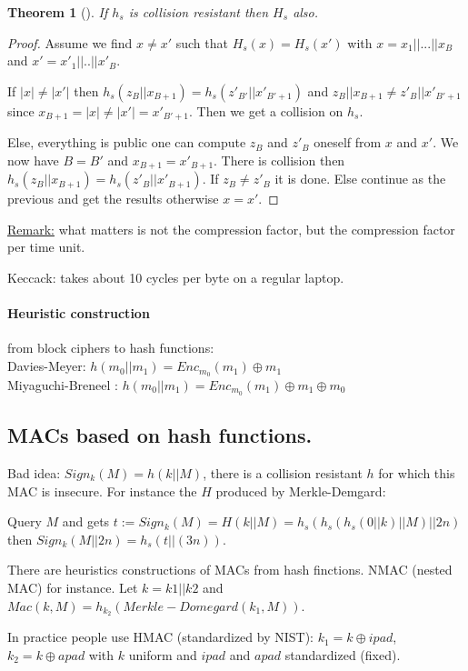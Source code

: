 \documentclass{article}
\newtheorem{thm}{Theorem}[section]
\newcommand{\Thm}[3]{\begin{thm}[#1]\label{#2}#3\end{thm}}
\newcommand{\Rem}{\underline{Remark:} }
\begin{document}
\Thm{}{}{If $h_s$ is collision resistant then $H_s$ also.}
\begin{proof}
Assume we find $x\neq x'$ such that $H_s(x)=H_s(x')$ with $x=x_1||...||x_{B}$ and $x'=x'_1||..||x'_B$.

If $|x|\neq |x'|$ then $h_s(z_B||x_{B+1})=h_s(z'_{B'}||x'_{B'+1})$ and  $z_B||x_{B+1}\neq z'_B||x'_{B'+1}$ since $x_{B+1}=|x|\neq|x'|=x'_{B'+1}$. Then we get a collision on $h_s$.

Else, everything is public one can compute $z_B$ and $z'_B$ oneself from $x$ and $x'$. We now have $B=B'$ and $x_{B+1}=x'_{B+1}$. There is collision then $h_s(z_B||x_{B+1})=h_s(z'_{B}||x'_{B+1})$. If $z_B\neq z'_B$ it is done. Else continue as the previous and get the results otherwise $x=x'$.
\end{proof}

\Rem what matters is not the compression factor, but the compression factor per time unit. 

Keccack: takes about 10 cycles per byte on a regular laptop.

\paragraph{Heuristic construction} from block ciphers to hash functions:\\
Davies-Meyer: $h(m_0||m_1)=Enc_{m_0}(m_1)\oplus m_1$\\
Miyaguchi-Breneel : $h(m_0||m_1)=Enc_{m_0}(m_1)\oplus m_1\oplus m_0$

\subsection{MACs based on hash functions.}
Bad idea: $Sign_k(M)=h(k||M)$, there is a collision resistant $h$ for which this MAC is insecure. For instance the $H$ produced by Merkle-Demgard:

Query $M$ and gets $t:=Sign_k(M)=H(k||M)=h_s(h_s(h_s(0||k)||M)||2n)$ then $Sign_k(M||2n)=h_s(t||(3n))$. 

There are heuristics constructions of MACs from hash finctions. NMAC (nested MAC) for instance. Let $k=k1||k2$ and $Mac(k,M)=h_{k_2}(Merkle-Domegard(k_1,M))$. 

In practice people use HMAC (standardized by NIST): $k_1=k\oplus ipad$, $k_2=k\oplus apad$ with $k$ uniform and $ipad$ and $apad$ standardized (fixed). 
\end{document}
